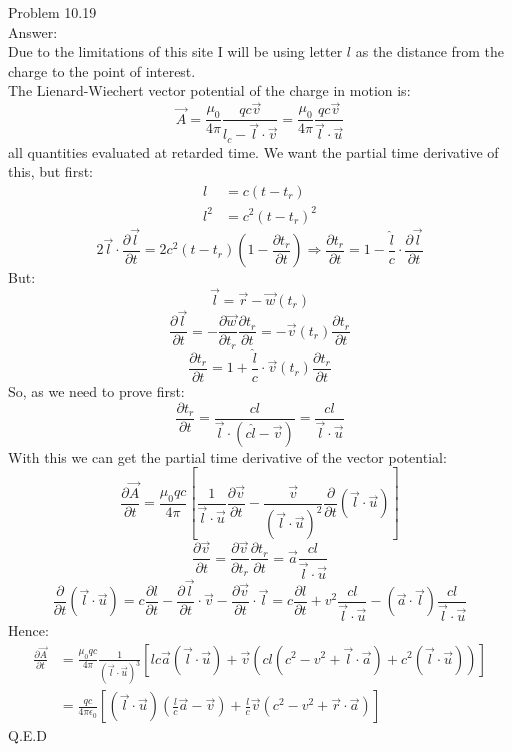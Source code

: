 \documentclass[UTF8]{ctexart}
\begin{document}
	Problem	10.19\\
	Answer:\\
	Due to the limitations of this site I will be using letter $l$ as the distance from the charge to the point of interest.\\
	The Lienard-Wiechert vector potential of the charge in motion is:\\
	$$\vec{A}=\frac{\mu_{0}}{4 \pi} \frac{q c \vec{v}}{l_{c}-\vec{l} \cdot \vec{v}}=\frac{\mu_{0}}{4 \pi} \frac{q c \vec{v}}{\vec{l} \cdot \vec{u}}$$
	all quantities evaluated at retarded time. We want the partial time derivative of this, but first:
	$$\begin{aligned}
	l &=c\left(t-t_{r}\right) \\
	l^{2} &=c^{2}\left(t-t_{r}\right)^{2}
	\end{aligned}$$
	$$2 \vec{l} \cdot \frac{\partial \vec{l}}{\partial t}=2 c^{2}\left(t-t_{r}\right)\left(1-\frac{\partial t_{r}}{\partial t}\right) \Rightarrow \frac{\partial t_{r}}{\partial t}=1-\frac{\hat{l}}{c} \cdot \frac{\partial \vec{l}}{\partial t}$$
	But:
	$$\vec{l}=\vec{r}-\vec{w}\left(t_{r}\right)$$
	$$\frac{\partial \vec{l}}{\partial t}=-\frac{\partial \vec{w}}{\partial t_{r}} \frac{\partial t_{r}}{\partial t}=-\vec{v}\left(t_{r}\right) \frac{\partial t_{r}}{\partial t}$$
	$$\frac{\partial t_{r}}{\partial t}=1+\frac{\hat{l}}{c} \cdot \vec{v}\left(t_{r}\right) \frac{\partial t_{r}}{\partial t}$$
	So, as we need to prove first:
	$$\frac{\partial t_{r}}{\partial t}=\frac{c l}{\vec{l} \cdot(c \hat{l}-\vec{v})}=\frac{c l}{\vec{l} \cdot \vec{u}}$$
	With this we can get the partial time derivative of the vector potential:
	$$\frac{\partial \vec{A}}{\partial t}=\frac{\mu_{0} q c}{4 \pi}\left[\frac{1}{\vec{l} \cdot \vec{u}} \frac{\partial \vec{v}}{\partial t}-\frac{\vec{v}}{(\vec{l} \cdot \vec{u})^{2}} \frac{\partial}{\partial t}(\vec{l} \cdot \vec{u})\right]$$
	$$\frac{\partial \vec{v}}{\partial t}=\frac{\partial \vec{v}}{\partial t_{r}} \frac{\partial t_{r}}{\partial t}=\vec{a} \frac{c l}{\vec{l} \cdot \vec{u}}$$
	$$\frac{\partial}{\partial t}(\vec{l} \cdot \vec{u})=c \frac{\partial l}{\partial t}-\frac{\partial \vec{l}}{\partial t} \cdot \vec{v}-\frac{\partial \vec{v}}{\partial t} \cdot \vec{l}=c \frac{\partial l}{\partial t}+v^{2} \frac{c l}{\vec{l} \cdot \vec{u}}-(\vec{a} \cdot \vec{l}) \frac{c l}{\vec{l} \cdot \vec{u}}$$
	Hence:
	$$\begin{aligned}
	\frac{\partial \vec{A}}{\partial t} &=\frac{\mu_{0} q c}{4 \pi} \frac{1}{(\vec{l} \cdot \vec{u})^{3}}\left[l c \vec{a}(\vec{l} \cdot \vec{u})+\vec{v}\left(c l\left(c^{2}-v^{2}+\vec{l} \cdot \vec{a}\right)+c^{2}(\vec{l} \cdot \vec{u})\right)\right] \\
	&=\frac{q c}{4 \pi \epsilon_{0}}\left[(\vec{l} \cdot \vec{u})\left(\frac{l}{c} \vec{a}-\vec{v}\right)+\frac{l}{c} \vec{v}\left(c^{2}-v^{2}+\vec{r} \cdot \vec{a}\right)\right]
	\end{aligned}$$
	Q.E.D\\
	
\end{document}
